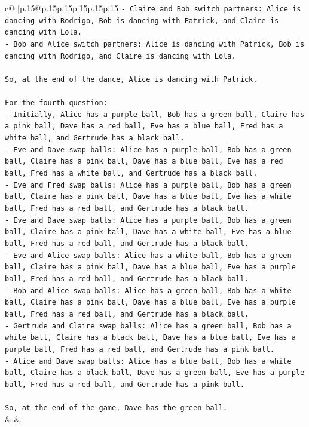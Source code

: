 \documentclass{article}
\begin{document}
{\begin{supertabular}{c@{$\;$}|p{.15\linewidth}@{}p{.15\linewidth}p{.15\linewidth}p{.15\linewidth}p{.15\linewidth}p{.15\linewidth}}
{{{\texttt{{-} Claire and Bob switch partners: Alice is dancing with Rodrigo, Bob is dancing with Patrick, and Claire is dancing with Lola.} \\
\texttt{{-} Bob and Alice switch partners: Alice is dancing with Patrick, Bob is dancing with Rodrigo, and Claire is dancing with Lola.} \\
\\ 
\texttt{So, at the end of the dance, Alice is dancing with Patrick.} \\
\\ 
\texttt{For the fourth question:} \\
\texttt{{-} Initially, Alice has a purple ball, Bob has a green ball, Claire has a pink ball, Dave has a red ball, Eve has a blue ball, Fred has a white ball, and Gertrude has a black ball.} \\
\texttt{{-} Eve and Dave swap balls: Alice has a purple ball, Bob has a green ball, Claire has a pink ball, Dave has a blue ball, Eve has a red ball, Fred has a white ball, and Gertrude has a black ball.} \\
\texttt{{-} Eve and Fred swap balls: Alice has a purple ball, Bob has a green ball, Claire has a pink ball, Dave has a blue ball, Eve has a white ball, Fred has a red ball, and Gertrude has a black ball.} \\
\texttt{{-} Eve and Dave swap balls: Alice has a purple ball, Bob has a green ball, Claire has a pink ball, Dave has a white ball, Eve has a blue ball, Fred has a red ball, and Gertrude has a black ball.} \\
\texttt{{-} Eve and Alice swap balls: Alice has a white ball, Bob has a green ball, Claire has a pink ball, Dave has a blue ball, Eve has a purple ball, Fred has a red ball, and Gertrude has a black ball.} \\
\texttt{{-} Bob and Alice swap balls: Alice has a green ball, Bob has a white ball, Claire has a pink ball, Dave has a blue ball, Eve has a purple ball, Fred has a red ball, and Gertrude has a black ball.} \\
\texttt{{-} Gertrude and Claire swap balls: Alice has a green ball, Bob has a white ball, Claire has a black ball, Dave has a blue ball, Eve has a purple ball, Fred has a red ball, and Gertrude has a pink ball.} \\
\texttt{{-} Alice and Dave swap balls: Alice has a blue ball, Bob has a white ball, Claire has a black ball, Dave has a green ball, Eve has a purple ball, Fred has a red ball, and Gertrude has a pink ball.} \\
\\ 
\texttt{So, at the end of the game, Dave has the green ball.} \\
            }
        }
    }
    & & \\ \\


\end{supertabular}}
\end{document}
